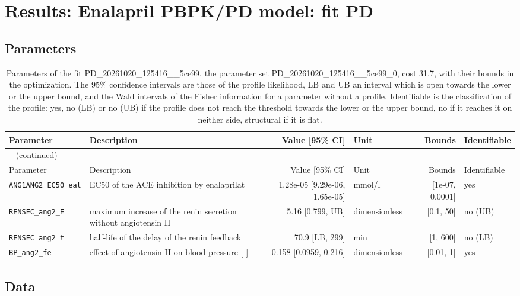 \documentclass{article}
\begin{document}
\section{Results: Enalapril PBPK/PD model: fit PD}

\subsection{Parameters}

\begin{longtable}{llrlrl}
\caption{Parameters of the fit PD\_20261020\_125416\_\_5ce99, the parameter set PD\_20261020\_125416\_\_5ce99\_0, cost 31.7, with their bounds in the optimization. The 95\% confidence intervals are those of the profile likelihood, LB and UB an interval which is open towards the lower or the upper bound, and the Wald intervals of the Fisher information for a parameter without a profile. Identifiable is the classification of the profile: yes, no (LB) or no (UB) if the profile does not reach the threshold towards the lower or the upper bound, no if it reaches it on neither side, structural if it is flat.}\label{tab:parameters:PD_20261020_125416__5ce99} \\
\toprule
Parameter & Description & Value [95\% CI] & Unit & Bounds & Identifiable \\
\midrule
\endfirsthead
\multicolumn{6}{l}{\small\tablename~\thetable{} (continued)} \\
\toprule
Parameter & Description & Value [95\% CI] & Unit & Bounds & Identifiable \\
\midrule
\endhead
\bottomrule
\endlastfoot
\texttt{ANG1ANG2\_EC50\_eat} & EC50 of the ACE inhibition by enalaprilat & 1.28e-05 [9.29e-06, 1.65e-05] & mmol/l & [1e-07, 0.0001] & yes \\
\texttt{RENSEC\_ang2\_E} & maximum increase of the renin secretion without angiotensin II & 5.16 [0.799, UB] & dimensionless & [0.1, 50] & no (UB) \\
\texttt{RENSEC\_ang2\_t} & half-life of the delay of the renin feedback & 70.9 [LB, 299] & min & [1, 600] & no (LB) \\
\texttt{BP\_ang2\_fe} & effect of angiotensin II on blood pressure [-] & 0.158 [0.0959, 0.216] & dimensionless & [0.01, 1] & yes \\
\end{longtable}

\subsection{Data}
\end{document}
